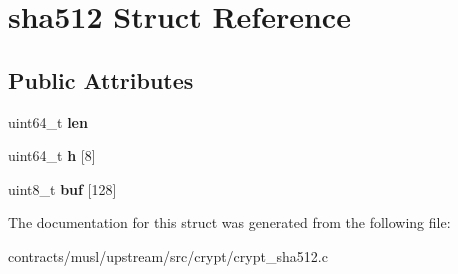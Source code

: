 \hypertarget{structsha512}{}\section{sha512 Struct Reference}
\label{structsha512}
\subsection*{Public Attributes}
\begin{DoxyCompactItemize}
\item 
\mbox{\label{structsha512_a088512c22c468ba8f81440804afaddd4}} 
uint64\+\_\+t {\bfseries len}
\item 
\mbox{\label{structsha512_a2671df171b1803378fbd31f4ca80a3c6}} 
uint64\+\_\+t {\bfseries h} \mbox{[}8\mbox{]}
\item 
\mbox{\label{structsha512_ae7909a73d247ca0178f7fe016d86d5ad}} 
uint8\+\_\+t {\bfseries buf} \mbox{[}128\mbox{]}
\end{DoxyCompactItemize}


The documentation for this struct was generated from the following file\+:\begin{DoxyCompactItemize}
\item 
contracts/musl/upstream/src/crypt/crypt\+\_\+sha512.\+c\end{DoxyCompactItemize}
